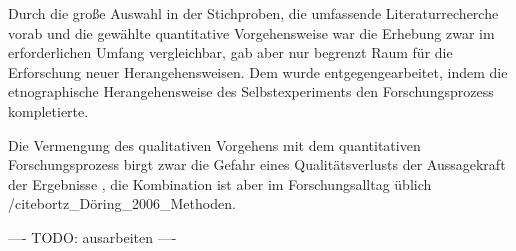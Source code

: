 Durch die große Auswahl in der Stichproben, die umfassende Literaturrecherche vorab und die gewählte quantitative Vorgehensweise war die Erhebung zwar im erforderlichen Umfang vergleichbar, gab aber nur begrenzt Raum für die Erforschung neuer Herangehensweisen. Dem wurde entgegengearbeitet, indem die etnographische Herangehensweise des Selbstexperiments den Forschungsprozess kompletierte.

Die Vermengung des qualitativen Vorgehens mit dem quantitativen Forschungsprozess birgt zwar die Gefahr eines Qualitätsverlusts der Aussagekraft der Ergebnisse \cite{suchen_Lamek_1993:198}, die Kombination ist aber im Forschungsalltag üblich /cite{bortz_Döring_2006_Methoden}.

---- TODO: ausarbeiten ----
